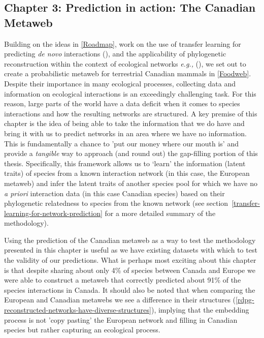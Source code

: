 \begin{refsection}
\subsection{Chapter 3: Prediction in action: The Canadian Metaweb}

Building on the ideas in \autoref{Roadmap}, work on the use of 
transfer learning for predicting \emph{de novo} interactions
(\cite{Runghen2021Exploiting}), and the applicability of phylogenetic
reconstruction within the context of ecological networks \emph{e.g.,}
(\cite{Braga2021Phylogenetic}), we set out to create a probabilistic metaweb for
terrestrial Canadian mammals in \autoref{Foodweb}. Despite their importance in many ecological processes, collecting data and information on ecological interactions is an exceedingly challenging task. For this reason, large parts of the world have a data deficit when it comes to species interactions and how the resulting networks are structured. A key premise of this chapter is the idea of being able to take the information that we do have and bring it with us to predict networks in an area where we have no information. This is fundamentally a chance to 'put our money where our mouth is' and provide a \emph{tangible} way to approach (and round out) the gap-filling portion of this thesis. Specifically, this framework allows us to ‘learn’ the information (latent traits) of species from a known interaction network (in this case, the European metaweb) and infer the latent traits of another species pool for which we have no \emph{a priori} interaction data (in this case Canadian species) based on their phylogenetic relatedness to species from the known network (see section~\ref{transfer-learning-for-network-prediction} for a more detailed summary of the methodology). 

Using the prediction of the Canadian metaweb as a way to test the methodology presented in this chapter is useful as we have existing datasets with which to test the validity of our predictions. What is perhaps most exciting about this chapter is that despite sharing about only 4\% of species between Canada and Europe we were able to construct a metaweb that correctly predicted about 91\% of the species interactions in Canada. It should also be noted that when comparing  the European and Canadian metawebs we see a difference in their structures (\autoref{rdpg-reconstructed-networks-have-diverse-structures}), implying that the embedding process is not 'copy pasting' the European network and filling in Canadian species but rather capturing an ecological process.


\end{refsection}
